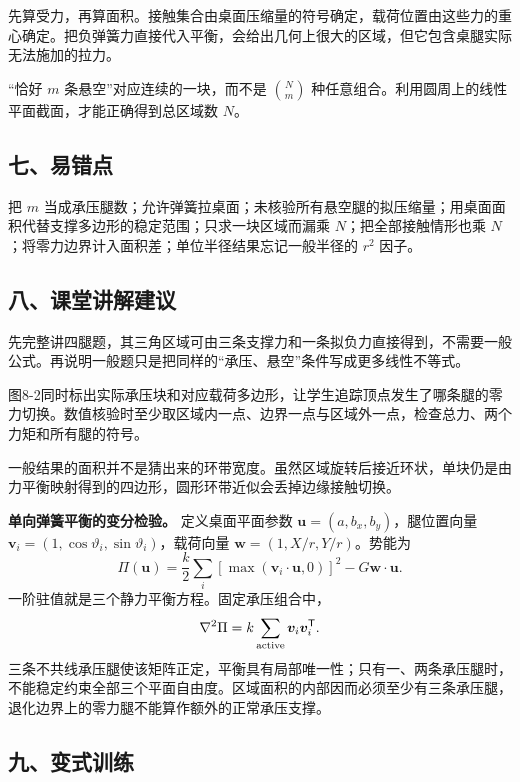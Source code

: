 \documentclass[12pt,a4paper,UTF8]{ctexart}
\begin{document}
先算受力，再算面积。接触集合由桌面压缩量的符号确定，载荷位置由这些力的重心确定。把负弹簧力直接代入平衡，会给出几何上很大的区域，但它包含桌腿实际无法施加的拉力。

``恰好 \(m\) 条悬空''对应连续的一块，而不是 \(\binom Nm\)
种任意组合。利用圆周上的线性平面截面，才能正确得到总区域数 \(N\)。

\subsection{七、易错点}\label{ux4e03ux6613ux9519ux70b9-7}

把 \(m\)
当成承压腿数；允许弹簧拉桌面；未核验所有悬空腿的拟压缩量；用桌面面积代替支撑多边形的稳定范围；只求一块区域而漏乘
\(N\)；把全部接触情形也乘
\(N\)；将零力边界计入面积差；单位半径结果忘记一般半径的 \(r^2\) 因子。

\subsection{八、课堂讲解建议}\label{ux516bux8bfeux5802ux8bb2ux89e3ux5efaux8bae-7}

先完整讲四腿题，其三角区域可由三条支撑力和一条拟负力直接得到，不需要一般公式。再说明一般题只是把同样的``承压、悬空''条件写成更多线性不等式。

图8-2同时标出实际承压块和对应载荷多边形，让学生追踪顶点发生了哪条腿的零力切换。数值核验时至少取区域内一点、边界一点与区域外一点，检查总力、两个力矩和所有腿的符号。

一般结果的面积并不是猜出来的环带宽度。虽然区域旋转后接近环状，单块仍是由力平衡映射得到的四边形，圆形环带近似会丢掉边缘接触切换。

\textbf{单向弹簧平衡的变分检验。} 定义桌面平面参数
\(\boldsymbol u=(a,b_x,b_y)\)，腿位置向量
\(\boldsymbol v_i=(1,\cos\vartheta_i,\sin\vartheta_i)\)，载荷向量
\(\boldsymbol w=(1,X/r,Y/r)\)。势能为 \[
\Pi(\boldsymbol u)=\frac k2\sum_i
[\max(\boldsymbol v_i\cdot\boldsymbol u,0)]^2
-G\boldsymbol w\cdot\boldsymbol u.
\] 一阶驻值就是三个静力平衡方程。固定承压组合中， \[
\nabla^2\Pi=k\sum_{\rm active}\boldsymbol v_i\boldsymbol v_i^{\mathsf T}.
\]
三条不共线承压腿使该矩阵正定，平衡具有局部唯一性；只有一、两条承压腿时，不能稳定约束全部三个平面自由度。区域面积的内部因而必须至少有三条承压腿，退化边界上的零力腿不能算作额外的正常承压支撑。

\subsection{九、变式训练}\label{ux4e5dux53d8ux5f0fux8badux7ec3-7}
\end{document}
